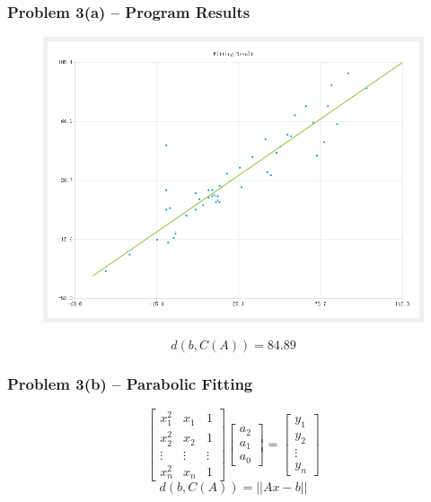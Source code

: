 \begin{frame}         %
    \frametitle{Problem 3(a) – Program Results}

    \begin{figure}
        \centering
        \includegraphics[height = 0.5\textheight]{img/result3_1.png}
    \end{figure}
        \begin{equation}
        d(b,C(A))=84.89
    \end{equation}
\end{frame}
\begin{frame}
        \frametitle{Problem 3(b) – Parabolic Fitting}

    \begin{equation}
        \begin{bmatrix}
            x_1^2 & x_1 & 1 \\
            x_2^2 & x_2 & 1 \\
            \vdots & \vdots & \vdots \\
            x_n^2 & x_n & 1
        \end{bmatrix}
        \begin{bmatrix}
            a_2 \\ a_1 \\ a_0
        \end{bmatrix}
        =
        \begin{bmatrix}
            y_1 \\ y_2 \\ \vdots \\ y_n
        \end{bmatrix}
    \end{equation}
    \begin{equation}
        d\left(b,C\left(A\right)\right) = \left||Ax-b|\right|
    \end{equation}

    \end{frame}

